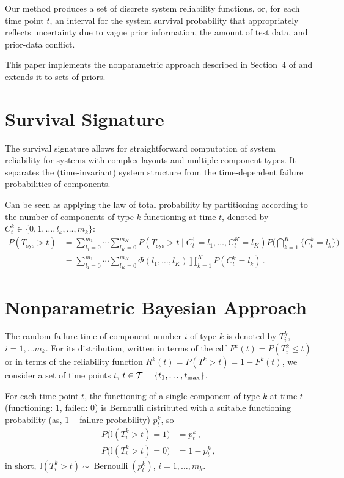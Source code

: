 \documentclass[authoryear, 12pt, a4paper]{elsarticle}
\def\Tsys{T_\text{sys}}
\newcommand{\indic}{\mathbb{I}}
\newcommand{\ber}{\operatorname{Bernoulli}}
\def\tmax{t_\text{max}}
\begin{document}
Our method produces a set of discrete system reliability functions,
or, for each time point $t$, an interval for the system survival probability
that appropriately reflects uncertainty due to vague prior information, the amount of test data, and prior-data conflict.

This paper implements the nonparametric approach described in Section~4 of \citet{2015:bayessurvsign}
and extends it to sets of priors.

\section{Survival Signature}

The survival signature allows for straightforward computation of system reliability
for systems with complex layouts and multiple component types.
It separates the (time-invariant) system structure from the time-dependent failure probabilities of components.

Can be seen as applying the law of total probability by partitioning
according to the number of components of type $k$ functioning at time $t$,
denoted by $C^k_t \in \{0, 1, \ldots, l_k, \ldots, m_k\}$:
\begin{align*}
P(\Tsys > t)
 &= \sum_{l_1=0}^{m_1} \cdots \sum_{l_K=0}^{m_K} P(\Tsys > t \mid C^1_t = l_1,\ldots, C^K_t = l_K)
                                                 P\Big( \bigcap_{k=1}^K \{ C^k_t = l_k\} \Big) \\
 &= \sum_{l_1=0}^{m_1} \cdots \sum_{l_K=0}^{m_K} \Phi(l_1, \ldots, l_K)
                                                 \prod_{k=1}^K P(C^k_t = l_k) \,.
\end{align*}


\section{Nonparametric Bayesian Approach}

The random failure time of component number $i$ of type $k$ is denoted by $T^k_i$, $i = 1, \ldots m_k$.
For its distribution, written in terms of the cdf $F^k(t) = P(T^k_i \le t)$
or in terms of the reliability function $R^k(t) = P(T^k > t) = 1 - F^k(t)$,
we consider a set of time points $t$, $t \in {\cal T} = \{t_1, \ldots, \tmax\}$.

For each time point $t$, the functioning of a single component of type $k$ at time $t$ (functioning: 1, failed: 0)
is Bernoulli distributed with a suitable functioning probability (as, $1-$failure probability) $p^k_t$, so
\begin{align*}
P\big(\indic(T^k_i > t) = 1\big) &= p^k_t\,, \\
P\big(\indic(T^k_i > t) = 0\big) &= 1 - p^k_t\,,
\end{align*}
in short, $\indic(T^k_i > t) \sim \ber(p^k_t)$, $i = 1, \ldots, m_k$.
\end{document}
